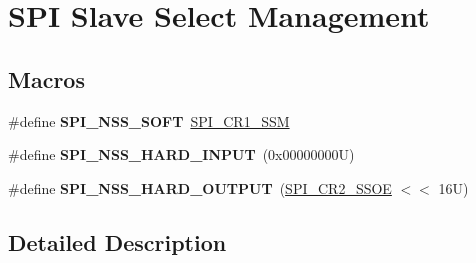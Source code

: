 \hypertarget{group___s_p_i___slave___select__management}{}\section{S\+PI Slave Select Management}
\label{group___s_p_i___slave___select__management}
\subsection*{Macros}
\begin{DoxyCompactItemize}
\item 
\mbox{\label{group___s_p_i___slave___select__management_ga0bf14691b9d03eb158f190cefa7ab8fc}} 
\#define {\bfseries S\+P\+I\+\_\+\+N\+S\+S\+\_\+\+S\+O\+FT}~\mbox{\hyperlink{group___peripheral___registers___bits___definition_ga0e236047e05106cf1ba7929766311382}{S\+P\+I\+\_\+\+C\+R1\+\_\+\+S\+SM}}
\item 
\mbox{\label{group___s_p_i___slave___select__management_ga62c42a5e28ce3b0dc92c5186c10accf8}} 
\#define {\bfseries S\+P\+I\+\_\+\+N\+S\+S\+\_\+\+H\+A\+R\+D\+\_\+\+I\+N\+P\+UT}~(0x00000000\+U)
\item 
\mbox{\label{group___s_p_i___slave___select__management_gab7f2da432661406a37fa2afe4efacd87}} 
\#define {\bfseries S\+P\+I\+\_\+\+N\+S\+S\+\_\+\+H\+A\+R\+D\+\_\+\+O\+U\+T\+P\+UT}~(\mbox{\hyperlink{group___peripheral___registers___bits___definition_gae94612b95395eff626f5f3d7d28352dd}{S\+P\+I\+\_\+\+C\+R2\+\_\+\+S\+S\+OE}} $<$$<$ 16\+U)
\end{DoxyCompactItemize}


\subsection{Detailed Description}
